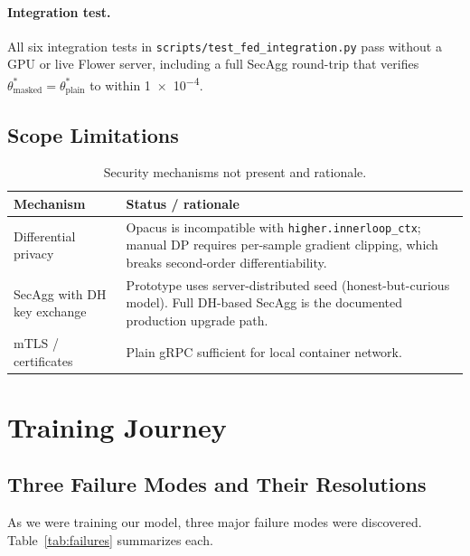 \documentclass[12pt]{article}
\theoremstyle{plain}
\begin{document}
\paragraph{Integration test.}
All six integration tests in \texttt{scripts/test\_fed\_integration.py} pass without a
GPU or live Flower server, including a full SecAgg round-trip that verifies
$\theta^*_{\text{masked}} = \theta^*_{\text{plain}}$ to within \num{1e-4}.

\subsection{Scope Limitations}

\begin{table}[H]
\centering
\caption{Security mechanisms not present and rationale.}
\label{tab:not-present}
\begin{tabular}{p{3.8cm} p{8.5cm}}
\toprule
\textbf{Mechanism} & \textbf{Status / rationale} \\
\midrule
Differential privacy &
  Opacus is incompatible with \texttt{higher.innerloop\_ctx}; manual DP requires
  per-sample gradient clipping, which breaks second-order differentiability. \\
SecAgg with DH key exchange &
  Prototype uses server-distributed seed (honest-but-curious model).
  Full DH-based SecAgg is the documented production upgrade path. \\
mTLS / certificates & Plain gRPC sufficient for local container network. \\
\bottomrule
\end{tabular}
\end{table}

\section{Training Journey}
\label{sec:training}

\subsection{Three Failure Modes and Their Resolutions}

As we were training our model, three major failure modes  were discovered.
Table~\ref{tab:failures} summarizes each.
\end{document}
